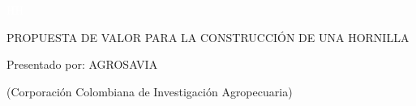 \documentclass{article}%
\begin{document}
%
\normalsize%
\begin{center}%
\textcolor{white}{ 
HH
}%
\linebreak%
\linebreak%
\linebreak%
\linebreak%
\linebreak%
\linebreak%
\linebreak%
\linebreak%
\linebreak%
\linebreak%
\linebreak%
\linebreak%
\linebreak%
\linebreak%
\linebreak%
\begin{Huge}%
PROPUESTA DE VALOR PARA LA CONSTRUCCIÓN DE UNA HORNILLA%
\end{Huge}%
\linebreak%
\linebreak%
\linebreak%
\linebreak%
\linebreak%
\linebreak%
\linebreak%
\linebreak%
\linebreak%
\linebreak%
\begin{Large}%
Presentado por: AGROSAVIA%
\end{Large}%
\linebreak%
\begin{small}%
(Corporación Colombiana de Investigación Agropecuaria)%
\end{small}%
\end{center}%
\newpage%
\end{document}
